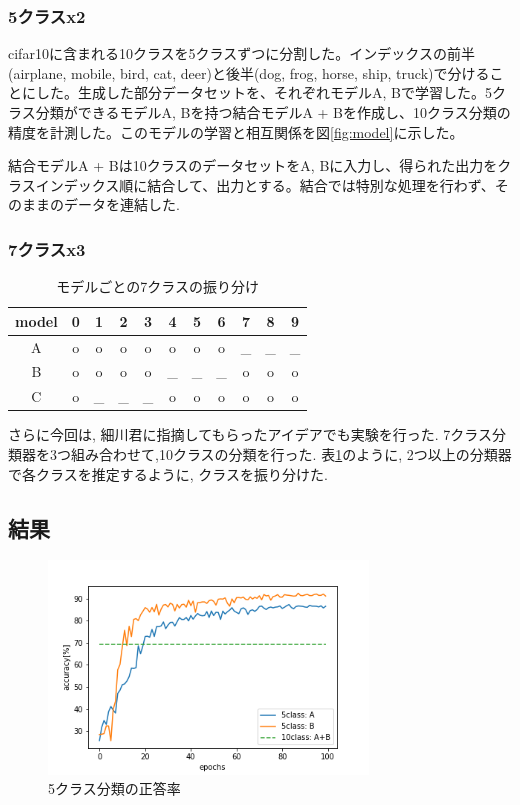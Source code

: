 \documentclass[twocolumn]{jarticle}     %
\begin{document}
\subsubsection{5クラスx2}

cifar10に含まれる10クラスを5クラスずつに分割した。インデックスの前半(airplane, mobile, bird, cat, deer)と後半(dog, frog, horse, ship, truck)で分けることにした。生成した部分データセットを、それぞれモデルA, Bで学習した。5クラス分類ができるモデルA, Bを持つ結合モデルA + Bを作成し、10クラス分類の精度を計測した。このモデルの学習と相互関係を図\ref{fig:model}に示した。

結合モデルA + Bは10クラスのデータセットをA, Bに入力し、得られた出力をクラスインデックス順に結合して、出力とする。結合では特別な処理を行わず、そのままのデータを連結した.

\subsubsection{7クラスx3}

\begin{table}[tb]
  \begin{center}
    \caption{モデルごとの7クラスの振り分け}
    \begin{tabular}{|c||c|c|c|c|c|c|c|c|c|c|} \hline
      model & 0 & 1 & 2 & 3 & 4 & 5 & 6 & 7 & 8 & 9 \\ \hline\hline
      A     & o & o & o & o & o & o & o & _ & _ & _ \\ \hline
      B     & o & o & o & o & _ & _ & _ & o & o & o \\ \hline
      C     & o & _ & _ & _ & o & o & o & o & o & o \\ \hline
    \end{tabular}
    \label{tab:class7}
  \end{center}
\end{table}

さらに今回は, 細川君に指摘してもらったアイデアでも実験を行った. 7クラス分類器を3つ組み合わせて,10クラスの分類を行った. 表\ref{tab:class7}のように, 2つ以上の分類器で各クラスを推定するように, クラスを振り分けた.

\subsection{結果}

\begin{figure}[tb]
	\begin{center}
		\includegraphics[clip,width=8.5cm]{accuracy5.png}
		\caption{5クラス分類の正答率}
		\label{fig:accuracy5}
	\end{center}
\end{figure}
\end{document}
